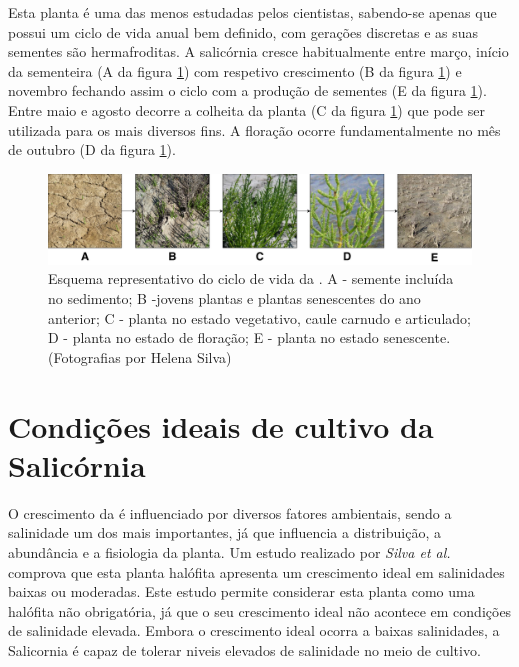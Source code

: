 Esta planta é uma das menos estudadas pelos cientistas\cite{Figueroa1987}, sabendo-se apenas que possui um ciclo de vida anual bem definido, com gerações discretas e as suas sementes são hermafroditas\cite{Silva2007}. A salicórnia cresce habitualmente entre março, início da sementeira (A da figura \ref{ciclodevida}) com respetivo crescimento (B da figura \ref{ciclodevida}) e novembro fechando assim o ciclo com a produção de sementes (E da figura \ref{ciclodevida}). Entre maio  e agosto decorre a colheita da planta\cite{RaquelPinto} (C da figura \ref{ciclodevida}) que pode ser utilizada para os mais diversos fins. A floração ocorre fundamentalmente no mês de outubro\cite{Figueroa1987} (D da figura \ref{ciclodevida}). 



	
\begin{figure}[!htb]
	\centering
	\includegraphics[width=\linewidth]{img/cap2-sali/ciclo/ciclodevida.pdf}
	\caption[Esquema representativo do ciclo de vida da \sr.]{Esquema representativo do ciclo de vida da \sr. A - semente incluída no sedimento; B -jovens plantas e plantas senescentes do ano anterior; C - planta no estado vegetativo, caule carnudo e articulado; D - planta no estado de floração; E - planta no estado senescente. (Fotografias por Helena Silva)}
	\label{ciclodevida}
\end{figure}



\section{Condições ideais de cultivo da Salicórnia}

O crescimento da \sr \space é influenciado por diversos fatores ambientais, sendo a salinidade um dos mais importantes, já que influencia a distribuição, a abundância e a fisiologia da planta. Um estudo realizado por \textit{Silva et al.}\cite{Silva2007} comprova que esta planta halófita apresenta um crescimento ideal em salinidades baixas ou moderadas. Este estudo permite considerar esta planta como uma halófita não obrigatória, já que o seu crescimento ideal não acontece em condições de salinidade elevada. Embora o crescimento ideal ocorra a baixas salinidades, a Salicornia é capaz de tolerar niveis elevados de salinidade no meio de cultivo\cite{Rubio-Casal2003}.

